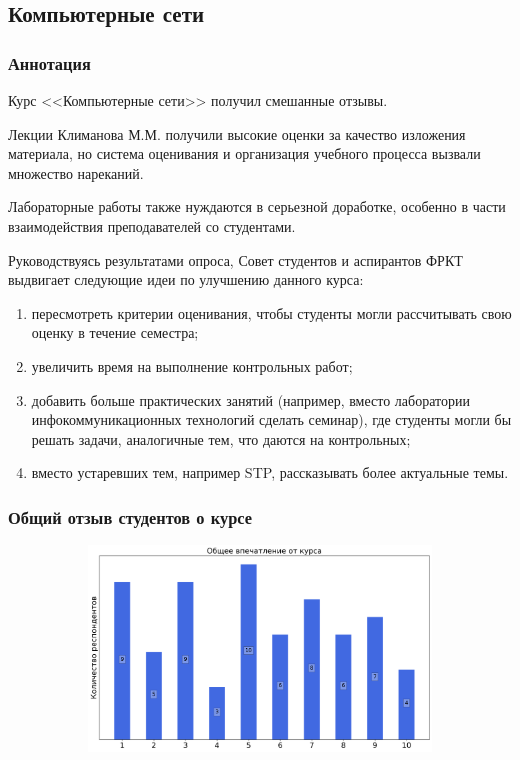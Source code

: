 \subsection{Компьютерные сети}
	
	\subsubsection{Аннотация}

        Курс <<Компьютерные сети>> получил смешанные отзывы. 
        
        Лекции Климанова М.М. получили высокие оценки за качество изложения материала, но система оценивания и организация учебного процесса вызвали множество нареканий. 
        
        Лабораторные работы также нуждаются в серьезной доработке, особенно в части взаимодействия преподавателей со студентами.

        Руководствуясь результатами опроса, Совет студентов и аспирантов ФРКТ выдвигает следующие идеи по улучшению данного курса:
        \begin{enumerate}
            \item пересмотреть критерии оценивания, чтобы студенты могли рассчитывать свою оценку в течение семестра;
            \item увеличить время на выполнение контрольных работ;
            \item добавить больше практических занятий (например, вместо лаборатории инфокоммуникационных технологий сделать семинар), где студенты могли бы решать задачи, аналогичные тем, что даются на контрольных;
            \item вместо устаревших тем, например STP, рассказывать более актуальные темы.
        \end{enumerate}	

	\subsubsection{Общий отзыв студентов о курсе}

		\begin{figure}[H]
			\centering
			\begin{subfigure}[b]{0.45\textwidth}
				\centering
				\includegraphics[width=\textwidth]{images/3 course/Компьютерные сети/general-0.png}
			\end{subfigure}
		\end{figure}

